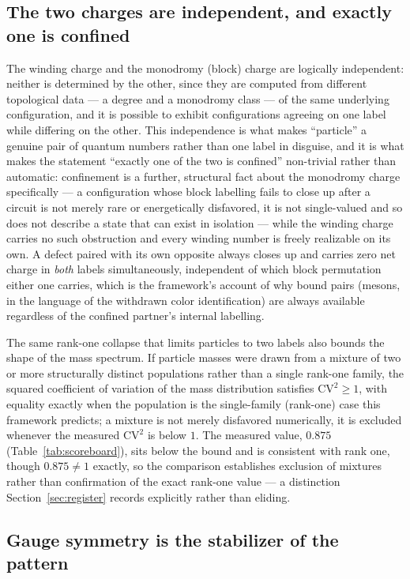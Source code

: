 \documentclass[aps,prd,twocolumn,superscriptaddress,nofootinbib]{revtex4-2}
\begin{document}
\subsection{The two charges are independent, and exactly one is confined}

The winding charge and the monodromy (block) charge are logically
independent: neither is determined by the other, since they are computed
from different topological data — a degree and a monodromy class — of
the same underlying configuration, and it is possible to exhibit
configurations agreeing on one label while differing on the other. This
independence is what makes ``particle'' a genuine pair of quantum
numbers rather than one label in disguise, and it is what makes the
statement ``exactly one of the two is confined'' non-trivial rather than
automatic: confinement is a further, structural fact about the
monodromy charge specifically — a configuration whose block labelling
fails to close up after a circuit is not merely rare or energetically
disfavored, it is not single-valued and so does not describe a state
that can exist in isolation — while the winding charge carries no such
obstruction and every winding number is freely realizable on its own. A
defect paired with its own opposite always closes up and carries zero
net charge in \emph{both} labels simultaneously, independent of which
block permutation either one carries, which is the framework's account
of why bound pairs (mesons, in the language of the withdrawn color
identification) are always available regardless of the confined
partner's internal labelling.

The same rank-one collapse that limits particles to two labels also
bounds the shape of the mass spectrum. If particle masses were drawn from
a mixture of two or more structurally distinct populations rather than a
single rank-one family, the squared coefficient of variation of the mass
distribution satisfies $\mathrm{CV}^2 \geq 1$, with equality exactly when
the population is the single-family (rank-one) case this framework
predicts; a mixture is not merely disfavored numerically, it is excluded
whenever the measured $\mathrm{CV}^2$ is below $1$. The measured value,
$0.875$ (Table~\ref{tab:scoreboard}), sits below the bound and is
consistent with rank one, though $0.875 \neq 1$ exactly, so the
comparison establishes exclusion of mixtures rather than confirmation of
the exact rank-one value — a distinction Section~\ref{sec:register}
records explicitly rather than eliding.

\subsection{Gauge symmetry is the stabilizer of the pattern}
\end{document}
